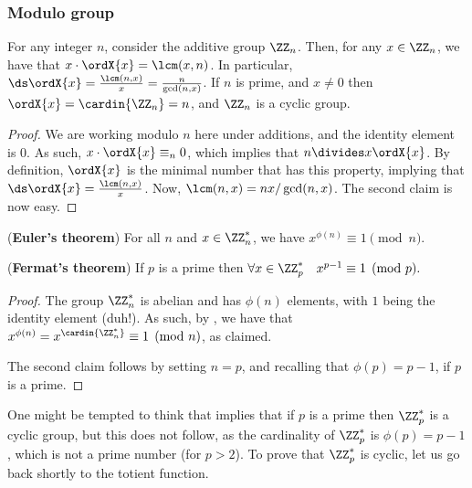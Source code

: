 \subsubsection{Modulo group}

\begin{lemma}
    For any integer $n$, consider the additive group $\ZZ_n$. Then,
    for any $x \in \ZZ_n$, we have that $x \cdot \ordX{x} =
    \lcm(x,n)$.  In particular, $\ds \ordX{x} = \frac{\lcm(n,x)}{x} =
    \frac{n}{\gcd(n,x)}$.  If $n$ is prime, and $x \neq 0$ then
    $\ordX{x} = \cardin{\ZZ_n} = n$, and $\ZZ_n$ is a cyclic group.
\end{lemma}

\begin{proof}
    We are working modulo $n$ here under additions, and the identity
    element is $0$. As such, $x \cdot \ordX{x} \equiv_n 0$, which
    implies that $n \divides x \ordX{x}$. By definition, $\ordX{x}$ is
    the minimal number that has this property, implying that $\ds
    \ordX{x} = \frac{\lcm(n,x)}{x}$. Now, $\lcm(n,x) = nx /
    \gcd(n,x)$. The second claim is now easy.
\end{proof}




\begin{theorem}
    (\textbf{Euler's theorem}) For all $n$ and $x \in \ZZ_n^*$, we
    have
    \begin{math}
        x^{\phi(n)} \equiv 1 \pmod{n}.
    \end{math}

    (\textbf{Fermat's theorem}) If $p$ is a prime then
    \begin{math}
        \forall x \in \ZZ_p^* \quad x^{p-1} \equiv 1 \pmod{p}.
    \end{math}
\end{theorem}

\begin{proof}
    The group $\ZZ_n^*$ is abelian and has $\phi(n)$ elements, with
    $1$ being the identity element (duh!). As such, by
    , we have that $x^{\phi(n)} =
    x^{\cardin{\ZZ_n^*}} \equiv 1 \pmod{n}$, as claimed.

    The second claim follows by setting $n=p$, and recalling that
    $\phi(p) = p-1$, if $p$ is a prime.
\end{proof}


One might be tempted to think that 
implies that if $p$ is a prime then $\ZZ_p^*$ is a cyclic group, but
this does not follow, as the cardinality of $\ZZ_p^*$ is $\phi(p) =
p-1$, which is not a prime number (for $p >2$).  To prove that
$\ZZ_p^*$ is cyclic, let us go back shortly to the totient function.


